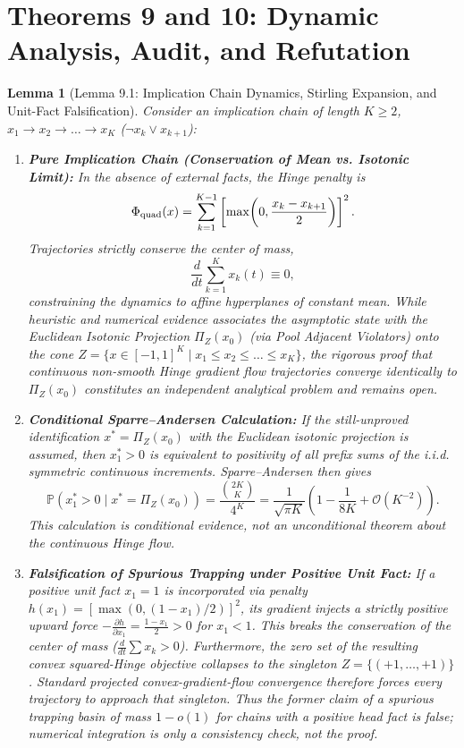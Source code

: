 \documentclass[11pt,a4paper]{article}
\newtheorem{lemma}[theorem]{Lemma}
\begin{document}
\section{Theorems 9 and 10: Dynamic Analysis, Audit, and Refutation}

\begin{lemma}[Lemma 9.1: Implication Chain Dynamics, Stirling Expansion, and Unit-Fact Falsification]
\label{lem:hinge_basin}
Consider an implication chain of length $K \ge 2$, $x_1 \to x_2 \to \dots \to x_K$ ($\neg x_k \lor x_{k+1}$):
\begin{enumerate}
    \item \textbf{Pure Implication Chain (Conservation of Mean vs. Isotonic Limit):} In the absence of external facts, the Hinge penalty is
    \[
    \Phi_{\rm quad}(x)=\sum_{k=1}^{K-1}
    \left[\max\!\left(0,\frac{x_k-x_{k+1}}{2}\right)\right]^2.
    \]
    Trajectories strictly conserve the center of mass,
    \[
    \frac{d}{dt}\sum_{k=1}^K x_k(t)\equiv0,
    \]
    constraining the dynamics to affine hyperplanes of constant mean. While heuristic and numerical evidence associates the asymptotic state with the Euclidean Isotonic Projection $\Pi_Z(x_0)$ (via Pool Adjacent Violators) onto the cone $Z = \{x \in [-1, 1]^K \mid x_1 \le x_2 \le \dots \le x_K\}$, the rigorous proof that continuous non-smooth Hinge gradient flow trajectories converge identically to $\Pi_Z(x_0)$ constitutes an independent analytical problem and remains open.
    \item \textbf{Conditional Sparre--Andersen Calculation:} If the still-unproved identification $x^*=\Pi_Z(x_0)$ with the Euclidean isotonic projection is assumed, then $x_1^*>0$ is equivalent to positivity of all prefix sums of the i.i.d. symmetric continuous increments. Sparre--Andersen then gives
    \begin{equation}
    \mathbb{P}(x^*_1 > 0\mid x^*=\Pi_Z(x_0))
    = \frac{\binom{2K}{K}}{4^K}
    = \frac{1}{\sqrt{\pi K}}\left(1 - \frac{1}{8K} + \mathcal{O}(K^{-2})\right).
    \end{equation}
    This calculation is conditional evidence, not an unconditional theorem about the continuous Hinge flow.
    \item \textbf{Falsification of Spurious Trapping under Positive Unit Fact:} If a positive unit fact $x_1 = 1$ is incorporated via penalty $h(x_1) = [\max(0, (1 - x_1)/2)]^2$, its gradient injects a strictly positive upward force $-\frac{\partial h}{\partial x_1} = \frac{1 - x_1}{2} > 0$ for $x_1 < 1$. This breaks the conservation of the center of mass ($\frac{d}{dt}\sum x_k > 0$). Furthermore, the zero set of the resulting convex squared-Hinge objective collapses to the singleton $Z = \{(+1, \dots, +1)\}$. Standard projected convex-gradient-flow convergence therefore forces every trajectory to approach that singleton. Thus the former claim of a spurious trapping basin of mass $1-o(1)$ for chains with a positive head fact is false; numerical integration is only a consistency check, not the proof.
\end{enumerate}
\end{lemma}
\end{document}
